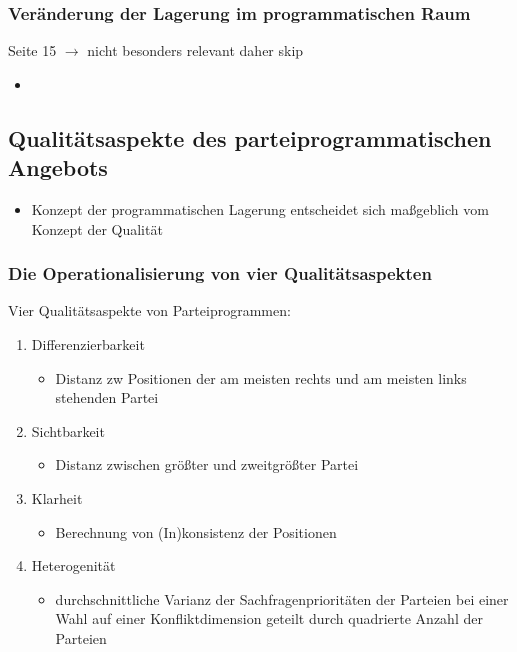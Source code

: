 \documentclass[11pt]{article}
\begin{document}
\subsubsection{Veränderung der Lagerung im programmatischen Raum}
\label{sec:orgc3c164b}
Seite 15 \(\rightarrow\) nicht besonders relevant daher skip 

\begin{itemize}
\item 
\end{itemize}

\subsection{Qualitätsaspekte des parteiprogrammatischen Angebots}
\label{sec:org917ebad}
\begin{itemize}
\item Konzept der programmatischen Lagerung entscheidet sich maßgeblich vom Konzept der Qualität
\end{itemize}

\subsubsection{Die Operationalisierung von vier Qualitätsaspekten}
\label{sec:orgbfa3546}
Vier Qualitätsaspekte von Parteiprogrammen:
\begin{enumerate}
\item Differenzierbarkeit
\begin{itemize}
\item Distanz zw Positionen der am meisten rechts und am meisten links stehenden Partei
\end{itemize}
\item Sichtbarkeit
\begin{itemize}
\item Distanz zwischen größter und zweitgrößter Partei
\end{itemize}
\item Klarheit
\begin{itemize}
\item Berechnung von (In)konsistenz der Positionen
\end{itemize}
\item Heterogenität
\begin{itemize}
\item durchschnittliche Varianz der Sachfragenprioritäten der Parteien bei einer Wahl auf einer Konfliktdimension geteilt durch quadrierte Anzahl der Parteien
\end{itemize}
\end{enumerate}
\end{document}
